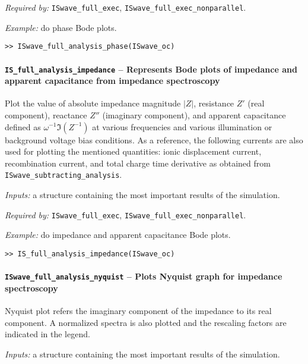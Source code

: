 	\textit{Required by:} \texttt{IS\-wave\_full\_exec}, \texttt{IS\-wave\_full\_exec\_nonparallel}.


	\textit{Example:} do phase Bode plots.
	\begin{lstlisting}[style=Matlab-editor]
>> ISwave_full_analysis_phase(ISwave_oc)
				\end{lstlisting}

	\paragraph{\texttt{IS\_full\_analysis\_impedance} -- Represents Bode plots of impedance and apparent capacitance from impedance spectroscopy}
	Plot the value of absolute impedance magnitude $|Z|$, resistance $Z'$ (real component), reactance $Z''$ (imaginary component), and apparent capacitance defined as $\omega^{-1}\Im(Z^{-1})$ at various frequencies and various illumination or background voltage bias conditions.
	As a reference, the following currents are also used for plotting the mentioned quantities: ionic displacement current, recombination current, and total charge time derivative as obtained from \texttt{IS\-wave\_subtracting\_analysis}.

	\textit{Inputs:} a structure containing the most important results of the simulation.



	\textit{Required by:} \texttt{IS\-wave\_full\_exec}, \texttt{IS\-wave\_full\_exec\_nonparallel}.

	\textit{Example:} do impedance and apparent capacitance Bode plots.
	\begin{lstlisting}[style=Matlab-editor]
>> IS_full_analysis_impedance(ISwave_oc)
\end{lstlisting}

	\paragraph{\texttt{IS\-wave\_full\_analysis\_nyquist} -- Plots Nyquist graph for impedance spectroscopy}
	Nyquist plot refers the imaginary component of the impedance to its real component.
	A normalized spectra is also plotted and the rescaling factors are indicated in the legend.

	\textit{Inputs:} a structure containing the most important results of the simulation.


